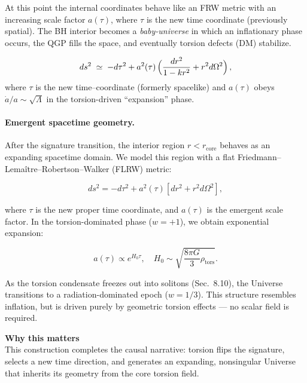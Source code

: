 \documentclass{article}
\begin{document}
At this point the internal coordinates behave like an FRW metric with an increasing scale factor $a(\tau)$, where $\tau$ is the new time coordinate (previously spatial). The BH interior becomes a \emph{baby-universe} in which an inflationary phase occurs, the QGP fills the space, and eventually torsion defects (DM) stabilize.

\begin{equation}\label{eq:auto96}
ds^2 \;\simeq\; -d\tau^2 + a^2(\tau)\,\Bigl(\frac{dr^2}{1-k r^2} + r^2 d\Omega^2\Bigr)\,,
\end{equation}
where \(\tau\) is the new time–coordinate (formerly spacelike) and \(a(\tau)\) obeys
\(\dot a/a\sim\sqrt{\Lambda}\) in the torsion-driven “expansion” phase.

\paragraph{Emergent spacetime geometry.}
After the signature transition, the interior region $r < r_\text{core}$ behaves as an expanding spacetime domain.
We model this region with a flat Friedmann–Lemaître–Robertson–Walker (FLRW) metric:

\begin{equation}\label{eq:frw_emergent}
ds^2 = -d\tau^2 + a^2(\tau) \left[dr^2 + r^2 d\Omega^2\right],
\end{equation}

where $\tau$ is the new proper time coordinate, and $a(\tau)$ is the emergent scale factor.
In the torsion-dominated phase ($w = +1$), we obtain exponential expansion:

\begin{equation}
a(\tau) \propto e^{H_0 \tau}, \quad H_0 \sim \sqrt{\frac{8\pi G}{3} \rho_{\text{tors}}}.
\end{equation}

As the torsion condensate freezes out into solitons (Sec.~8.10), the Universe transitions to a radiation-dominated epoch ($w = 1/3$).
This structure resembles inflation, but is driven purely by geometric torsion effects — no scalar field is required.

\begin{tcolorbox}[
  colback=white,
  colframe=black!30,
  boxrule=0.3pt,
  arc=2pt,
  left=6pt,
  right=6pt,
  top=4pt,
  bottom=4pt,
  enhanced
]
\textbf{Why this matters} \\
\vspace{2pt}
This construction completes the causal narrative: torsion flips the signature, selects a new time direction,
and generates an expanding, nonsingular Universe that inherits its geometry from the core torsion field.
\end{tcolorbox}
\end{document}

